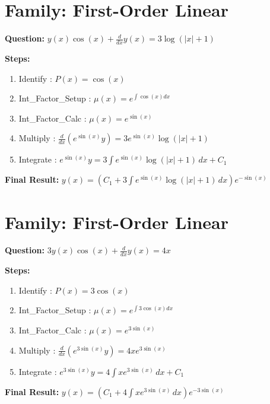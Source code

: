 \documentclass{article}
\begin{document}
\section*{Family: First-Order Linear}
\textbf{Question:} $y{\left(x \right)} \cos{\left(x \right)} + \frac{d}{d x} y{\left(x \right)} = 3 \log{\left(\left|{x}\right| + 1 \right)}$

\textbf{Steps:}
\begin{enumerate}
\item Identify :  $P(x) = \cos{\left(x \right)}$
\item Int_Factor_Setup :  $\mu(x) = e^{\int \cos{\left(x \right)} dx}$
\item Int_Factor_Calc :  $\mu(x) = e^{\sin{\left(x \right)}}$
\item Multiply :  $\frac{d}{dx}(e^{\sin{\left(x \right)}}y) = 3 e^{\sin{\left(x \right)}} \log{\left(\left|{x}\right| + 1 \right)}$
\item Integrate :  $e^{\sin{\left(x \right)}}y = 3 \int e^{\sin{\left(x \right)}} \log{\left(\left|{x}\right| + 1 \right)}\, dx + C_1$
\end{enumerate}
\textbf{Final Result:} $y{\left(x \right)} = \left(C_{1} + 3 \int e^{\sin{\left(x \right)}} \log{\left(\left|{x}\right| + 1 \right)}\, dx\right) e^{- \sin{\left(x \right)}}$

\section*{Family: First-Order Linear}
\textbf{Question:} $3 y{\left(x \right)} \cos{\left(x \right)} + \frac{d}{d x} y{\left(x \right)} = 4 x$

\textbf{Steps:}
\begin{enumerate}
\item Identify :  $P(x) = 3 \cos{\left(x \right)}$
\item Int_Factor_Setup :  $\mu(x) = e^{\int 3 \cos{\left(x \right)} dx}$
\item Int_Factor_Calc :  $\mu(x) = e^{3 \sin{\left(x \right)}}$
\item Multiply :  $\frac{d}{dx}(e^{3 \sin{\left(x \right)}}y) = 4 x e^{3 \sin{\left(x \right)}}$
\item Integrate :  $e^{3 \sin{\left(x \right)}}y = 4 \int x e^{3 \sin{\left(x \right)}}\, dx + C_1$
\end{enumerate}
\textbf{Final Result:} $y{\left(x \right)} = \left(C_{1} + 4 \int x e^{3 \sin{\left(x \right)}}\, dx\right) e^{- 3 \sin{\left(x \right)}}$
\end{document}
